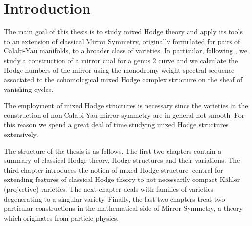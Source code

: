 \documentclass{article}
\numberwithin{equation}{section}
\begin{document}
\newpage
\thispagestyle{empty}
\mbox{}
\newpage

\restoregeometry
\tableofcontents
\pagebreak






\section{Introduction}
The main goal of this thesis is to study mixed Hodge theory and apply its tools to an extension of classical Mirror Symmetry, originally formulated for pairs of Calabi-Yau manifolds, to a broader class of varieties. In particular, following \cite{GKR17}, we study a construction of a mirror dual for a genus 2 curve and we calculate the Hodge numbers of the mirror using the monodromy weight spectral sequence associated to the cohomological mixed Hodge complex structure on the sheaf of vanishing cycles.

The employment of mixed Hodge structures is necessary since the varieties in the construction of non-Calabi Yau mirror symmetry are in general not smooth.
For this reason we spend a great deal of time studying mixed Hodge structures extensively.

The structure of the thesis is as follows.
The first two chapters contain a summary of classical Hodge theory, Hodge structures and their variations.
The third chapter introduces the notion of mixed Hodge structure, central for extending features of classical Hodge theory to not necessarily compact K\"{a}hler (projective) varieties. The next chapter deals with families of varieties degenerating to a singular variety. Finally, the last two chapters treat two particular constructions in the mathematical side of Mirror Symmetry, a theory which originates from particle physics. 
\end{document}
